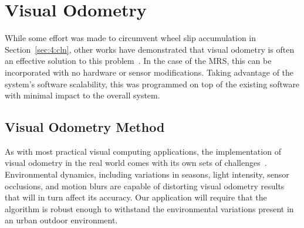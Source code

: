 \section{Visual Odometry}\label{sec:4:vo}
While some effort was made to circumvent wheel slip accumulation in Section~\ref{sec:4:cln}, other works have demonstrated that visual odometry is often an effective solution to this problem~\cite{aqel_review_2016}. In the case of the MRS, this can be incorporated with no hardware or sensor modifications. Taking advantage of the system’s software scalability, this was programmed on top of the existing software with minimal impact to the overall system.

\subsection{Visual Odometry Method}
As with most practical visual computing applications, the implementation of visual odometry in the real world comes with its own sets of challenges~\cite{zhao_visual_2015}. Environmental dynamics, including variations in seasons, light intensity, sensor occlusions, and motion blurs are capable of distorting visual odometry results that will in turn affect its accuracy. Our application will require that the algorithm is robust enough to withstand the environmental variations present in an urban outdoor environment.

